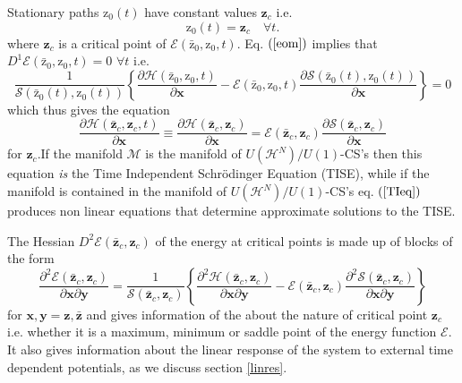 \documentclass[aps,preprint]{revtex4}%
\begin{document}
Stationary paths $\mathrm{z}_{0}\left(  t\right)  $ have constant values
$\mathbf{z}_{c}$ i.e.
\begin{equation}
\mathrm{z}_{0}\left(  t\right)  =\mathbf{z}_{c}\quad\forall t.
\end{equation}
where $\mathbf{z}_{c}$ is a critical point of $\mathcal{E}\left(
\mathrm{\bar{z}}_{0}\mathbf{,}\mathrm{z}_{0},t\right)  .$ Eq. $\left(
\ref{eom}\right)  $ implies that $D^{1}\mathcal{E}\left(  \mathrm{\bar{z}}%
_{0}\mathbf{,}\mathrm{z}_{0},t\right)  =0$ $\forall t$ i.e.
\begin{equation}
\frac{1}{\mathcal{S}\left(  \mathrm{\bar{z}}_{0}\left(  t\right)
,\mathrm{z}_{0}\left(  t\right)  \right)  }\left\{  \frac{\partial
\mathcal{H}\left(  \mathrm{\bar{z}}_{0}\mathbf{,}\mathrm{z}_{0},t\right)
}{\partial\mathbf{x}}-\mathcal{E}\left(  \mathrm{\bar{z}}_{0}\mathbf{,}%
\mathrm{z}_{0},t\right)  \frac{\partial\mathcal{S}\left(  \mathrm{\bar{z}}%
_{0}\left(  t\right)  ,\mathrm{z}_{0}\left(  t\right)  \right)  }%
{\partial\mathbf{x}}\right\}  =0
\end{equation}
which thus gives the equation
\begin{equation}
\frac{\partial\mathcal{H}\left(  \mathbf{\bar{z}}_{c},\mathbf{z}_{c},t\right)
}{\partial\mathbf{x}}\equiv\frac{\partial\mathcal{H}\left(  \mathbf{\bar{z}%
}_{c},\mathbf{z}_{c}\right)  }{\partial\mathbf{x}}=\mathcal{E}\left(
\mathbf{\bar{z}}_{c},\mathbf{z}_{c}\right)  \frac{\partial\mathcal{S}\left(
\mathbf{\bar{z}}_{c},\mathbf{z}_{c}\right)  }{\partial\mathbf{x}} \label{TIeq}%
\end{equation}
for $\mathbf{z}_{c}.$If the manifold $\mathcal{M}$ is the manifold of
$U\left(  \mathcal{H}^{N}\right)  /U\left(  1\right)  $-CS's then this
equation \emph{is} the Time Independent Schr\"{o}dinger Equation (TISE), while
if the manifold is contained in the manifold of $U\left(  \mathcal{H}%
^{N}\right)  /U\left(  1\right)  $-CS's eq. $\left(  \ref{TIeq}\right)  $
produces non linear equations that determine approximate solutions to the TISE.

The Hessian $D^{2}\mathcal{E}\left(  \mathbf{\bar{z}}_{c},\mathbf{z}%
_{c}\right)  $ of the energy at critical points is made up of blocks of the
form
\begin{equation}
\frac{\partial^{2}\mathcal{E}\left(  \mathbf{\bar{z}}_{c},\mathbf{z}%
_{c}\right)  }{\partial\mathbf{x}\partial\mathbf{y}}=\frac{1}{\mathcal{S}%
\left(  \mathbf{\bar{z}}_{c},\mathbf{z}_{c}\right)  }\left\{  \frac
{\partial^{2}\mathcal{H}\left(  \mathbf{\bar{z}}_{c},\mathbf{z}_{c}\right)
}{\partial\mathbf{x}\partial\mathbf{y}}-\mathcal{E}\left(  \mathbf{\bar{z}%
}_{c},\mathbf{z}_{c}\right)  \frac{\partial^{2}\mathcal{S}\left(
\mathbf{\bar{z}}_{c},\mathbf{z}_{c}\right)  }{\partial\mathbf{x}%
\partial\mathbf{y}}\right\}
\end{equation}
for $\mathbf{x},\mathbf{y=z},\mathbf{\bar{z}}$ and gives information of the
about the nature of critical point $\mathbf{z}_{c}$ i.e. whether it is a
maximum, minimum or saddle point of the energy function $\mathcal{E}.$ It also
gives information about the linear response of the system to external time
dependent potentials, as we discuss section \ref{linres}.
\end{document}
